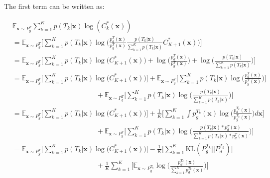 \documentclass{article}
\begin{document}
The first term can be written as:

\begin{equation}
\begin{split}
&\mathbb{E}_{\mathbf{x} \sim {P_g^T}}\sum_{k=1}^{K}p({T_k}|\mathbf{x})\log(C^*_k(\mathbf{x}))\\
&= \mathbb{E}_{\mathbf{x} \sim {P_g^T}}\bigg[\sum_{k=1}^{K}p({T_k}|\mathbf{x})\log\Big(\frac{p_d^T(\mathbf{x})}{p_g^T(\mathbf{x})}\frac{p({T_k}|\mathbf{x})}{\sum_{k=1}^{K}p({T_k}|\mathbf{x})} C^*_{K+1}(\mathbf{x})\Big)\bigg] \\
&= \mathbb{E}_{\mathbf{x} \sim P_g^T}\bigg[\sum_{k=1}^{K}p({T_k}|\mathbf{x})\log\Big(C^*_{K+1}(\mathbf{x})\Big) + \log\Big(\frac{p_d^T(\mathbf{x})}{p_g^T(\mathbf{x})}\Big) + \log\Big(\frac{p({T_k}|\mathbf{x})}{\sum_{k=1}^{K}p({T_k}|\mathbf{x})}\Big)\bigg]\\
&= \mathbb{E}_{\mathbf{x} \sim P_g^T}\bigg[\sum_{k=1}^{K}p({T_k}|\mathbf{x})\log\Big(C^*_{K+1}(\mathbf{x})\Big)\bigg] + \mathbb{E}_{\mathbf{x} \sim P_g^T}\bigg[\sum_{k=1}^{K}p({T_k}|\mathbf{x})\log\Big(\frac{p_d^T(\mathbf{x})}{p_g^T(\mathbf{x})}\Big)\bigg] \\
&\quad \quad \quad \quad \quad \quad \quad \quad \quad \quad \quad \quad + \mathbb{E}_{\mathbf{x} \sim P_g^T}\bigg[\sum_{k=1}^{K}p({T_k}|\mathbf{x})\log\Big(\frac{p({T_k}|\mathbf{x})}{\sum_{k=1}^{K}p({T_k}|\mathbf{x})}\Big)\bigg]\\
&= \mathbb{E}_{\mathbf{x} \sim P_g^T}\bigg[\sum_{k=1}^{K}p({T_k}|\mathbf{x})\log\Big(C^*_{K+1}(\mathbf{x})\Big)\bigg] +  \frac{1}{K}\bigg[\sum_{k=1}^{K}\int p_g^{T_k}(\mathbf{x})\log\Big(\frac{p_d^{T_k}(\mathbf{x})}{p_g^{T_k}(\mathbf{x})}\Big)d\mathbf{x}\bigg] \\
&\quad \quad \quad \quad \quad \quad \quad \quad \quad \quad \quad \quad + \mathbb{E}_{\mathbf{x} \sim P_g^T}\bigg[\sum_{k=1}^{K}p({T_k}|\mathbf{x})\log\Big(\frac{p({T_k}|\mathbf{x})*p_d^T(\mathbf{x})}{\sum_{k=1}^{K}p({T_k}|\mathbf{x})*p_d^T(\mathbf{x})}\Big)\bigg]\\
&= \mathbb{E}_{\mathbf{x} \sim P_g^T}\bigg[\sum_{k=1}^{K}p({T_k}|\mathbf{x})\log\Big(C^*_{K+1}(\mathbf{x})\Big)\bigg] - \frac{1}{K}\bigg[\sum_{k=1}^{K}\mathrm{KL}(P_g^{T_k}||P_d^{T_k})\bigg] \\
&\quad \quad \quad \quad \quad \quad \quad \quad \quad \quad \quad \quad + \frac{1}{K}\sum_{k=1}^{K}\bigg[\mathbb{E}_{\mathbf{x} \sim P_g^{T_k}}\log\Big(\frac{p_d^{T_k}(\mathbf{x})}{\sum_{k=1}^{K}p_d^{T_k}(\mathbf{x})}\Big)\bigg]\\
\end{split} 
\label{g_obj_lower_bound}
\end{equation}
\end{document}
